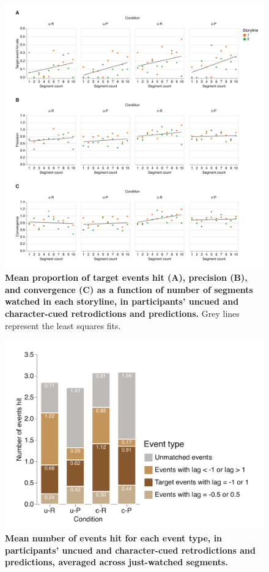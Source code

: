 \documentclass[10pt]{article}
\begin{document}
  \newpage




\begin{figure}[tp]
    \centering
    \includegraphics[width=\textwidth]{supp1.pdf}
    \caption{\textbf{Mean proportion of target events hit (A), precision (B), and convergence (C) as a function of number of segments watched in each storyline, in participants' uncued and character-cued retrodictions and predictions.} Grey lines represent the least squares fits.}
    \label{fig:supp1}
\end{figure}

\begin{figure}[tp]
    \centering
    \includegraphics[width=\textwidth]{supp2.pdf}
    \caption{\textbf{Mean number of events hit for each event type, in participants' uncued and character-cued retrodictions and predictions, averaged across just-watched segments.}}
    \label{fig:supp2}
\end{figure}
\end{document}
